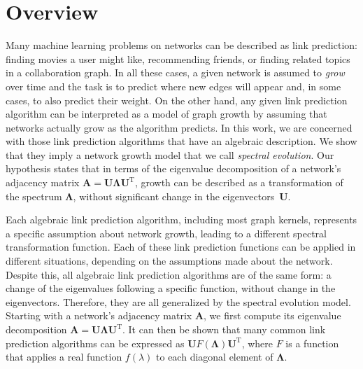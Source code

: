 \documentclass[11pt,a4paper]{book}
\begin{document}
\section{Overview}
\label{sec:spectral-evolution-model:definition}
Many machine learning problems on networks can be described as link
prediction: finding movies a user might like, recommending friends, or
finding related topics in a collaboration graph.  In all these cases, a
given network is assumed to \emph{grow} over time and the task is to
predict where new edges will appear and, in some cases, to also predict
their weight.  On the other hand, any given link prediction algorithm
can be interpreted as a model of graph growth by assuming that networks
actually grow as the algorithm predicts.  In this work, we are concerned
with those link prediction algorithms that have an algebraic
description.  We show that they imply a network growth model that we
call \emph{spectral evolution}.  Our hypothesis states that in terms of
the eigenvalue decomposition of a network's adjacency matrix $\mathbf
A=\mathbf U\mathbf \Lambda\mathbf U^{\mathrm T}$, growth can be
described as a transformation of the spectrum $\mathbf \Lambda$, without
significant change in the eigenvectors~$\mathbf U$.

Each algebraic link prediction algorithm, including most graph
kernels, represents a specific assumption about network growth,
leading to a different spectral transformation function.  
Each of these link prediction functions can be applied in different
situations, depending on the assumptions made about the
network. Despite this, all algebraic link prediction algorithms are
of the same form: a change of the eigenvalues following a specific
function, without change in the eigenvectors.  Therefore, they are all
generalized by the spectral evolution model.  
Starting with a
network's adjacency matrix $\mathbf A$, we first compute its eigenvalue
decomposition 
$\mathbf A=\mathbf U\mathbf\Lambda \mathbf U^{\mathrm T}$.  It can then be shown
that many common link prediction 
algorithms can be expressed as $\mathbf U F(\mathbf\Lambda)\mathbf U^{\mathrm T}$,
where $F$ is a function 
that applies a real function $f(\lambda)$ to each diagonal
element of $\mathbf\Lambda$.
\end{document}
